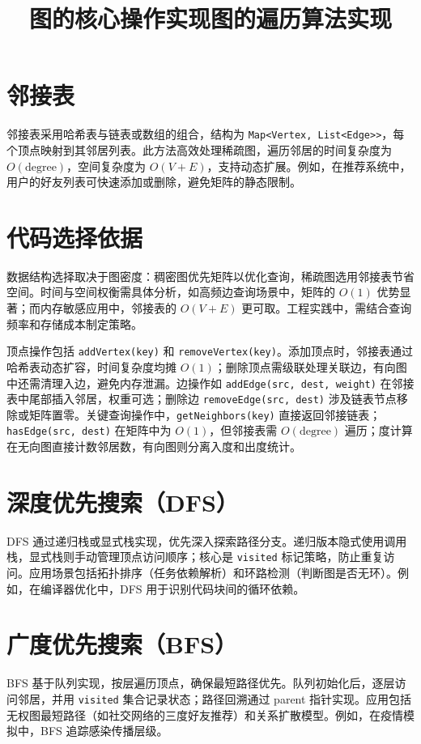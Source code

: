 \chapter{邻接表}
邻接表采用哈希表与链表或数组的组合，结构为 \texttt{Map<Vertex, List<Edge>>}，每个顶点映射到其邻居列表。此方法高效处理稀疏图，遍历邻居的时间复杂度为 $O(\text{degree})$，空间复杂度为 $O(V + E)$，支持动态扩展。例如，在推荐系统中，用户的好友列表可快速添加或删除，避免矩阵的静态限制。\par
\chapter{代码选择依据}
数据结构选择取决于图密度：稠密图优先矩阵以优化查询，稀疏图选用邻接表节省空间。时间与空间权衡需具体分析，如高频边查询场景中，矩阵的 $O(1)$ 优势显著；而内存敏感应用中，邻接表的 $O(V + E)$ 更可取。工程实践中，需结合查询频率和存储成本制定策略。\par
\title{图的核心操作实现}
顶点操作包括 \texttt{addVertex(key)} 和 \texttt{removeVertex(key)}。添加顶点时，邻接表通过哈希表动态扩容，时间复杂度均摊 $O(1)$；删除顶点需级联处理关联边，有向图中还需清理入边，避免内存泄漏。边操作如 \texttt{addEdge(src, dest, weight)} 在邻接表中尾部插入邻居，权重可选；删除边 \texttt{removeEdge(src, dest)} 涉及链表节点移除或矩阵置零。关键查询操作中，\texttt{getNeighbors(key)} 直接返回邻接链表；\texttt{hasEdge(src, dest)} 在矩阵中为 $O(1)$，但邻接表需 $O(\text{degree})$ 遍历；度计算在无向图直接计数邻居数，有向图则分离入度和出度统计。\par
\title{图的遍历算法实现}
\chapter{深度优先搜索（DFS）}
DFS 通过递归栈或显式栈实现，优先深入探索路径分支。递归版本隐式使用调用栈，显式栈则手动管理顶点访问顺序；核心是 \texttt{visited} 标记策略，防止重复访问。应用场景包括拓扑排序（任务依赖解析）和环路检测（判断图是否无环）。例如，在编译器优化中，DFS 用于识别代码块间的循环依赖。\par
\chapter{广度优先搜索（BFS）}
BFS 基于队列实现，按层遍历顶点，确保最短路径优先。队列初始化后，逐层访问邻居，并用 \texttt{visited} 集合记录状态；路径回溯通过 parent 指针实现。应用包括无权图最短路径（如社交网络的三度好友推荐）和关系扩散模型。例如，在疫情模拟中，BFS 追踪感染传播层级。\par
